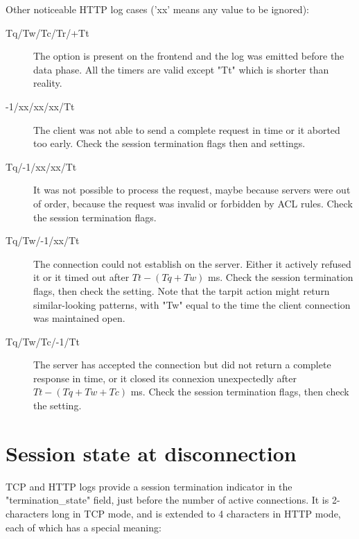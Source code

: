 Other noticeable HTTP log cases ('xx' means any value to be ignored):

\begin{description}
\item[Tq/Tw/Tc/Tr/+Tt]
                   The option  is present on the frontend and the log
                   was emitted before the data phase. All the timers are valid
                   except "Tt" which is shorter than reality.

\item[-1/xx/xx/xx/Tt]
                   The client was not able to send a complete request in time
                   or it aborted too early. Check the session termination flags
                   then  and  settings.

\item[Tq/-1/xx/xx/Tt]
                   It was not possible to process the request, maybe because
                   servers were out of order, because the request was invalid
                   or forbidden by ACL rules. Check the session termination
                   flags.

\item[Tq/Tw/-1/xx/Tt]
                   The connection could not establish on the server. Either it
                   actively refused it or it timed out after $Tt-(Tq+Tw)$ ms.
                   Check the session termination flags, then check the
                    setting. Note that the tarpit action might
                   return similar-looking patterns, with "Tw" equal to the time
                   the client connection was maintained open.

\item[Tq/Tw/Tc/-1/Tt]
                   The server has accepted the connection but did not return
                   a complete response in time, or it closed its connexion
                   unexpectedly after $Tt-(Tq+Tw+Tc)$ ms. Check the session
                   termination flags, then check the  setting.
\end{description}

\section{Session state at disconnection}
\label{sec:session_state_at_disconnection}

TCP and HTTP logs provide a session termination indicator in the
"termination\_state" field, just before the number of active connections. It is
2-characters long in TCP mode, and is extended to 4 characters in HTTP mode,
each of which has a special meaning:

